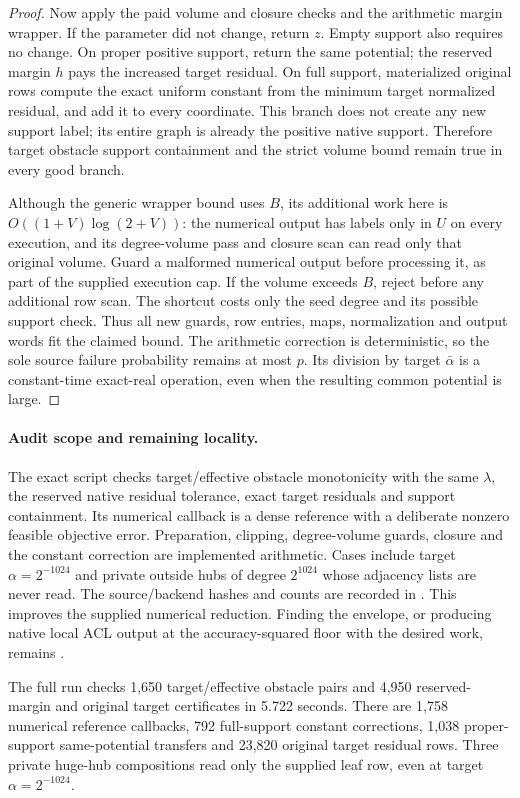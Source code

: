 \begin{proof}
Now apply the paid volume and closure checks and the arithmetic margin
wrapper. If the parameter did not change, return $z$. Empty support
also requires no change. On proper positive support, return the same
potential; the reserved margin $h$ pays the increased target residual.
On full support, materialized original rows compute the exact uniform
constant from the minimum target normalized residual, and add it to
every coordinate. This branch does not create any new support label;
its entire graph is already the positive native support. Therefore
target obstacle support containment and the strict volume bound remain
true in every good branch.

Although the generic wrapper bound uses $B$, its additional work here
is $O((1+V)\log(2+V))$: the numerical output has labels only in $U$
on every execution, and its degree-volume pass and closure scan can
read only that original volume. Guard a malformed numerical output
before processing it, as part of the supplied execution cap. If the
volume exceeds $B$, reject before any additional row scan. The shortcut
costs only the seed degree and its possible support check. Thus all
new guards, row entries, maps, normalization and output words fit the
claimed bound. The arithmetic correction is deterministic, so the sole
source failure probability remains at most $p$. Its division by target
$\bar\alpha$ is a constant-time exact-real operation, even when the
resulting common potential is large.
\end{proof}

\paragraph{Audit scope and remaining locality.}
The exact script  checks
target/effective obstacle monotonicity with the same $\lambda$, the
reserved native residual tolerance, exact target residuals and support
containment. Its numerical callback is a dense reference with a deliberate
nonzero feasible objective error. Preparation, clipping, degree-volume
guards, closure and the constant correction are implemented arithmetic.
Cases include target $\alpha=2^{-1024}$ and private outside hubs of
degree $2^{1024}$ whose adjacency lists are never read.
The source/backend hashes and counts are recorded in
.
This improves the supplied numerical reduction. Finding the envelope,
or producing native local ACL output at the accuracy-squared floor with
the desired work, remains \statusopen.

The full run checks 1,650 target/effective obstacle pairs and 4,950
reserved-margin and original target certificates in 5.722 seconds.
There are 1,758 numerical reference callbacks, 792 full-support constant
corrections, 1,038 proper-support same-potential transfers and 23,820
original target residual rows. Three private huge-hub compositions read
only the supplied leaf row, even at target $\alpha=2^{-1024}$.
